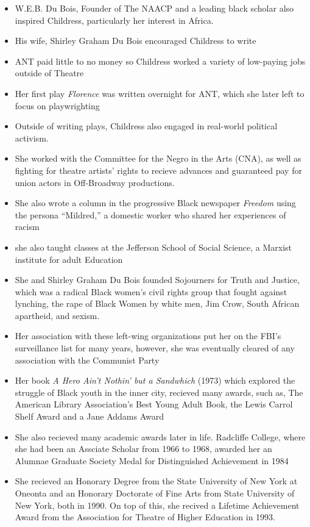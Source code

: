 \documentclass[12pt]{article}
\begin{document}
\begin{itemize}
\begin{itemize}
				\item W.E.B. Du Bois, Founder of The NAACP and a leading black scholar also inspired Childress, particularly her interest in Africa.
				\item His wife, Shirley Graham Du Bois encouraged Childress to write
				\item ANT paid little to no money so Childress worked a variety of low-paying jobs outside of Theatre
				\item Her first play \textit{Florence} was written overnight for ANT, which she later left to focus on playwrighting
				\item Outside of writing plays, Childress also engaged in real-world political activism.
				\item She worked with the Committee for the Negro in the Arts (CNA), as well as fighting for theatre artists' rights to recieve advances and guaranteed pay for union actors in Off-Broadway productions.
				\item She also wrote a column in the progressive Black newspaper \textit{Freedom} using the persona ``Mildred,'' a domestic worker who shared her experiences of racism
				\item she also taught classes at the Jefferson School of Social Science, a Marxist institute for adult Education
				\item She and Shirley Graham Du Bois founded Sojourners for Truth and Justice, which was a radical Black women's civil rights group that fought against lynching, the rape of Black Women by white men, Jim Crow, South African apartheid, and sexism.
				\item Her association with these left-wing organizations put her on the FBI's surveillance list for many years, however, she was eventually cleared of any association with the Communist Party
				\item Her book \textit{A Hero Ain't Nothin' but a Sandwhich} (1973) which explored the struggle of Black youth in the inner city, recieved many awards, such as, The American Library Association's Best Young Adult Book, the Lewis Carrol Shelf Award and a Jane Addams Award
				\item She also recieved many academic awards later in life. Radcliffe College, where she had been an Assciate Scholar from 1966 to 1968, awarded her an Alumnae Graduate Society Medal for Distinguished Achievement in 1984 
				\item She recieved an Honorary Degree from the State University of New York at Oneonta and an Honorary Doctorate of Fine Arts from State University of New York, both in 1990. On top of this, she recived a Lifetime Achievement Award from the Association for Theatre of Higher Education in 1993.
			\end{itemize}
        \end{itemize}
	\newpage
\end{document}
